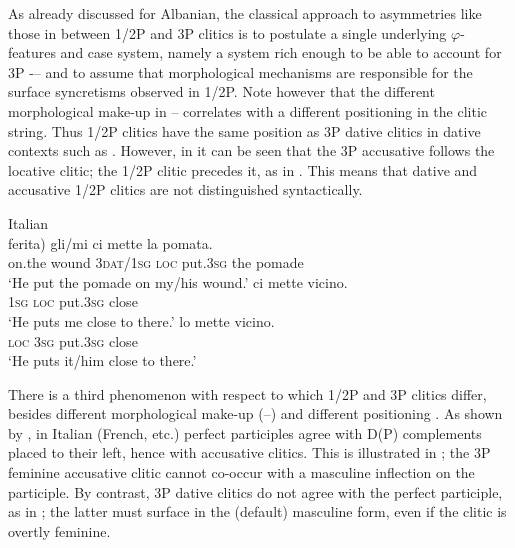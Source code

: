 \documentclass[output=paper,colorlinks,citecolor=brown,nonflat]{./langscibook}
\begin{document}
As already discussed for Albanian, the classical approach to asymmetries like those in  between 1/2P and 3P clitics is to postulate a single underlying $\varphi ${}-features and case system, namely a system rich enough to be able to account for 3P -– and to assume that morphological mechanisms are responsible for the surface syncretisms observed in 1/2P. Note however that the different morphological make-up in -- correlates with a different positioning in the clitic string. Thus 1/2P clitics have the same position as 3P dative clitics in dative contexts such as . However, in  it can be seen that the 3P accusative follows the locative clitic; the 1/2P clitic precedes it, as in . This means that dative and accusative 1/2P clitics are not distinguished syntactically.

\ea%
    \label{ex:manzini:13}
    Italian\\
    \ea\label{ex:manzini:13a}
     {ferita)}   {gli/mi}    {ci}   {mette} {la} {pomata}.\\
        on.the wound   \textsc{3dat/1sg}   \textsc{loc}   put.\textsc{3sg} the pomade\\
    \glt ‘He put the pomade on my/his wound.’
    \ex\label{ex:manzini:13b}
      {ci}   {mette}   {vicino}.\\
        \textsc{1sg}  \textsc{loc}  put.\textsc{3sg} close\\
    \glt ‘He puts me close to there.’
    \ex\label{ex:manzini:13c}
      {lo}  {mette}   {vicino}.\\
        \textsc{loc}  \textsc{3sg}   put.\textsc{3sg} close\\
    \glt ‘He puts it/him close to there.’
    \z
\z

There is a third phenomenon with respect to which 1/2P and 3P clitics differ, besides different morphological make-up (--) and different positioning . As shown by \citet{Kayne1989}, in Italian (French, etc.) perfect participles agree with D(P) complements placed to their left, hence with accusative clitics. This is illustrated in ; the 3P feminine accusative clitic cannot co-occur with a masculine inflection on the participle. By contrast, 3P dative clitics do not agree with the perfect participle, as in ; the latter must surface in the (default) masculine form, even if the clitic is overtly feminine.
\end{document}
